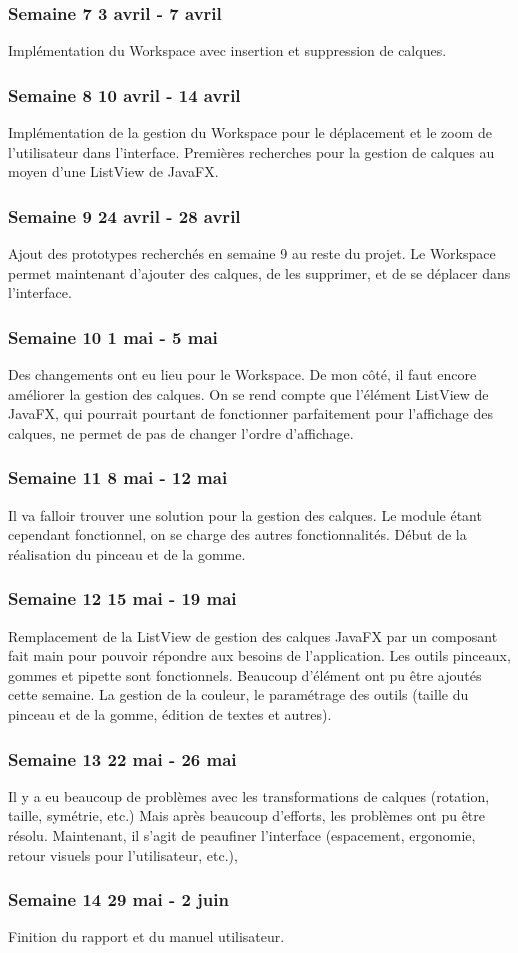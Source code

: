 \subsubsection{Semaine 7 3 avril - 7 avril}
Implémentation du Workspace avec insertion et suppression de calques.
\subsubsection{Semaine 8 10 avril - 14 avril}
Implémentation de la gestion du Workspace pour le déplacement et le zoom de l'utilisateur dans l'interface. Premières recherches pour la gestion de calques au moyen d'une ListView de JavaFX.
\subsubsection{Semaine 9 24 avril - 28 avril}
Ajout des prototypes recherchés en semaine 9 au reste du projet. Le Workspace permet maintenant d'ajouter des calques, de les supprimer, et de se déplacer dans l'interface. 
\subsubsection{Semaine 10 1 mai - 5 mai}
Des changements ont eu lieu pour le Workspace. De mon côté, il faut encore améliorer la gestion des calques.
On se rend compte que l'élément ListView de JavaFX, qui pourrait pourtant de fonctionner parfaitement pour l'affichage des calques, ne permet de pas de changer l'ordre d'affichage.
\subsubsection{Semaine 11 8 mai - 12 mai} 
Il va falloir trouver une solution pour la gestion des calques. Le module étant cependant fonctionnel, on se charge des autres fonctionnalités. Début de la réalisation du pinceau et de la gomme.
\subsubsection{Semaine 12 15 mai - 19 mai}
Remplacement de la ListView de gestion des calques JavaFX par un composant fait main pour pouvoir répondre aux besoins de l'application. Les outils pinceaux, gommes et pipette sont fonctionnels. Beaucoup d'élément ont pu être ajoutés cette semaine. La gestion de la couleur, le paramétrage des outils (taille du pinceau et de la gomme, édition de textes et autres).
\subsubsection{Semaine 13 22 mai - 26 mai}
Il y a eu beaucoup de problèmes avec les transformations de calques (rotation, taille, symétrie, etc.) Mais après beaucoup d'efforts, les problèmes ont pu être résolu. Maintenant, il s'agit de peaufiner l'interface (espacement, ergonomie, retour visuels pour l'utilisateur, etc.),
\subsubsection{Semaine 14 29 mai - 2 juin}
Finition du rapport et du manuel utilisateur.



